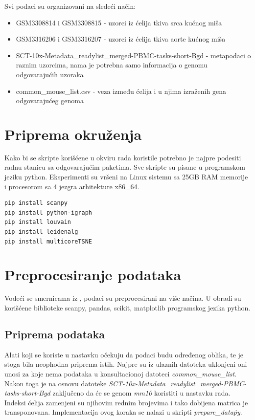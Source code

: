 \documentclass{article}
\begin{document}
Svi podaci su organizovani na sledeći način:
\begin{itemize}
  \item GSM3308814 i GSM3308815 - uzorci iz ćelija tkiva srca kućnog miša
  \item GSM3316206 i GSM3316207 - uzorci iz ćelija tkiva aorte kućnog miša
  \item SCT-10x-Metadata\_readylist\_merged-PBMC-tasks-short-Bgd - metapodaci o raznim uzorcima, nama je potrebna samo informacija o genomu odgovarajućih uzoraka
  \item common\_mouse\_list.csv - veza između ćelija i u njima izraženih gena odgovarajućeg genoma
\end{itemize}

\section{Priprema okruženja}

Kako bi se skripte korišćene u okviru rada koristile potrebno je najpre podesiti radnu stanicu sa odgovarajućim paketima. Sve skripte su pisane u programskom jeziku python. Eksperimenti su vršeni na Linux sistemu sa 25GB RAM memorije i procesorom sa 4 jezgra arhitekture x86\_64.

\begin{lstlisting}[frame=single,language=bash,caption=Instaliranje neophodnih paketa]
pip install scanpy
pip install python-igraph
pip install louvain
pip install leidenalg
pip install multicoreTSNE
\end{lstlisting}

\section{Preprocesiranje podataka}
\label{sec:headings}

Vodeći se smernicama iz \cite{luecken2019current}, podaci su preprocesirani na više načina. U obradi su korišćene biblioteke scanpy, pandas, scikit, matplotlib programskog jezika python. 

\subsection{Priprema podataka}
Alati koji se koriste u nastavku očekuju da podaci budu određenog oblika, te je stoga bila neophodna priprema istih. Najpre su iz ulaznih datoteka uklonjeni oni unosi za koje nema podataka u konsultacionoj datoteci \emph{common\_mouse\_list}. Nakon toga je na osnovu datoteke \emph{SCT-10x-Metadata\_readylist\_merged-PBMC-tasks-short-Bgd} zaključeno da će se genom \emph{mm10} koristiti u nastavku rada. Indeksi ćelija zamenjeni su njihovim rednim brojevima i tako dobijena matrica je transponovana. Implementacija ovog koraka se nalazi u skripti \emph{prepare\_data\.py}. 
\end{document}
